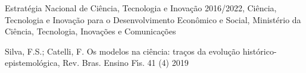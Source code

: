 \documentclass[
12pt,		%
openright,	%
twoside,  %
a4paper,			%
chapter=TITLE,		%
english,			%
french,				%
spanish,			%
brazil				%
]{USPSC-classe/USPSC}
\begin{document}
\begin{flushleft}
\begin{flushleft}
\begin{flushleft}
\begin{flushleft}
\begin{flushleft}
\begin{flushleft}
\begin{flushleft}
\begin{flushleft}
[ENCTI, 2016] Estrat\'egia Nacional de Ci\^encia, Tecnologia e Inova\c{c}\~ao 2016/2022, Ci\^encia, Tecnologia e Inova\c{c}\~ao para o Desenvolvimento Econ\^omico e Social, Minist\'erio da Ci\^encia, Tecnologia, Inova\c{c}\~oes e Comunica\c{c}\~oes
\end{flushleft}


\end{flushleft}


\end{flushleft}


\end{flushleft}


\end{flushleft}


\end{flushleft}


\end{flushleft}


\end{flushleft}


\begin{flushleft}
\begin{flushleft}
\begin{flushleft}
\begin{flushleft}
\begin{flushleft}
\begin{flushleft}
\begin{flushleft}
\begin{flushleft}
 Silva, F.S.; Catelli, F. Os modelos na ci\^encia: tra\c{c}os da evolu\c{c}\~ao hist\'orico-epistemol\'ogica,  Rev. Bras. Ensino F\'{\i}s. 41 (4) 2019 

\end{flushleft}


\end{flushleft}


\end{flushleft}


\end{flushleft}


\end{flushleft}


\end{flushleft}


\end{flushleft}


\end{flushleft}
\end{document}
